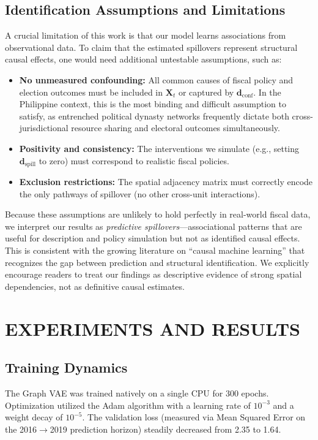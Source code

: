 \documentclass[conference]{IEEEtran}
\begin{document}
\subsection{Identification Assumptions and Limitations}\label{sec:identification}
A crucial limitation of this work is that our model learns associations from observational data. To claim that the estimated spillovers represent structural causal effects, one would need additional untestable assumptions, such as:
\begin{itemize}
\item \textbf{No unmeasured confounding:} All common causes of fiscal policy and election outcomes must be included in $\mathbf{X}_t$ or captured by $\mathbf{d}_{\text{conf}}$. In the Philippine context, this is the most binding and difficult assumption to satisfy, as entrenched political dynasty networks frequently dictate both cross-jurisdictional resource sharing and electoral outcomes simultaneously.
\item \textbf{Positivity and consistency:} The interventions we simulate (e.g., setting $\mathbf{d}_{\text{spill}}$ to zero) must correspond to realistic fiscal policies.
\item \textbf{Exclusion restrictions:} The spatial adjacency matrix must correctly encode the only pathways of spillover (no other cross-unit interactions).
\end{itemize}

Because these assumptions are unlikely to hold perfectly in real-world fiscal data, we interpret our results as \textit{predictive spillovers}—associational patterns that are useful for description and policy simulation but not as identified causal effects. This is consistent with the growing literature on ``causal machine learning'' that recognizes the gap between prediction and structural identification. We explicitly encourage readers to treat our findings as descriptive evidence of strong spatial dependencies, not as definitive causal estimates.

\section{EXPERIMENTS AND RESULTS}

\subsection{Training Dynamics}
The Graph VAE was trained natively on a single CPU for 300 epochs. Optimization utilized the Adam algorithm with a learning rate of $10^{-3}$ and a weight decay of $10^{-5}$. The validation loss (measured via Mean Squared Error on the 2016$\to$2019 prediction horizon) steadily decreased from 2.35 to 1.64.
\end{document}
